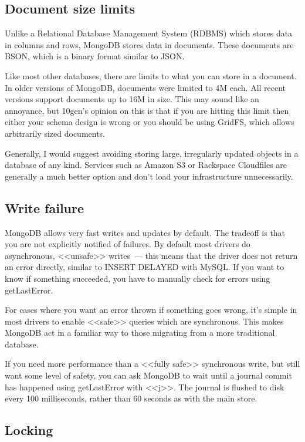 \subsection{Document size limits}

Unlike a Relational Database Management System (RDBMS) which stores data in columns and rows, MongoDB stores data in documents. These documents are BSON, which is a binary format similar to JSON.

Like most other databases, there are limits to what you can store in a document. In older versions of MongoDB, documents were limited to 4M each. All recent versions support documents up to 16M in size. This may sound like an annoyance, but 10gen's opinion on this is that if you are hitting this limit then either your schema design is wrong or you should be using GridFS, which allows arbitrarily sized documents.

Generally, I would suggest avoiding storing large, irregularly updated objects in a database of any kind. Services such as Amazon S3 or Rackspace Cloudfiles are generally a much better option and don't load your infrastructure unnecessarily.

\subsection{Write failure}

MongoDB allows very fast writes and updates by default. The tradeoff is that you are not explicitly notified of failures. By default most drivers do asynchronous, <<unsafe>> writes~--- this means that the driver does not return an error directly, similar to INSERT DELAYED with MySQL. If you want to know if something succeeded, you have to manually check for errors using getLastError.

For cases where you want an error thrown if something goes wrong, it's simple in most drivers to enable <<safe>> queries which are synchronous. This makes MongoDB act in a familiar way to those migrating from a more traditional database.

If you need more performance than a <<fully safe>> synchronous write, but still want some level of safety, you can ask MongoDB to wait until a journal commit has happened using getLastError with <<j>>. The journal is flushed to disk every 100 milliseconds, rather than 60 seconds as with the main store.

\subsection{Locking}

